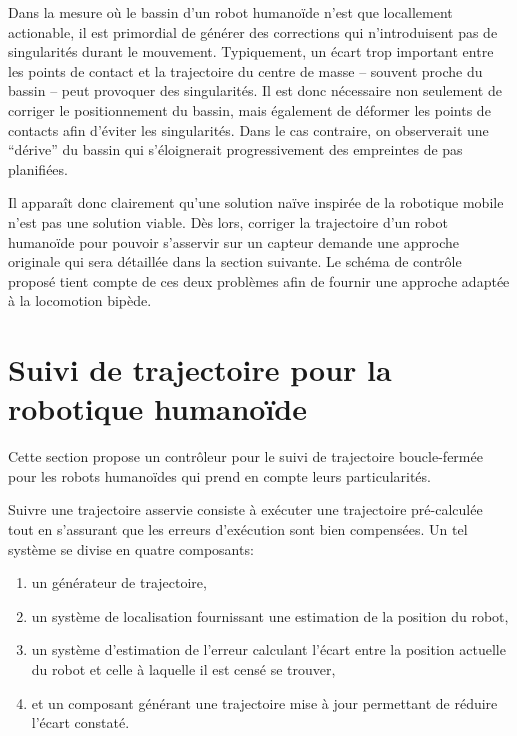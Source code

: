 Dans la mesure où le bassin d'un robot humanoïde n'est que locallement
actionable, il est primordial de générer des corrections qui
n'introduisent pas de singularités durant le mouvement. Typiquement,
un écart trop important entre les points de contact et la trajectoire
du centre de masse -- souvent proche du bassin -- peut provoquer des
singularités. Il est donc nécessaire non seulement de corriger le
positionnement du bassin, mais également de déformer les points de
contacts afin d'éviter les singularités. Dans le cas contraire, on
observerait une ``dérive'' du bassin qui s'éloignerait progressivement
des empreintes de pas planifiées.

Il apparaît donc clairement qu'une solution naïve inspirée de la
robotique mobile n'est pas une solution viable. Dès lors, corriger la
trajectoire d'un robot humanoïde pour pouvoir s'asservir sur un
capteur demande une approche originale qui sera détaillée dans la
section suivante. Le schéma de contrôle proposé tient compte de ces
deux problèmes afin de fournir une approche adaptée à la locomotion
bipède.

\section{Suivi de trajectoire pour la robotique humanoïde}\label{closedloop}


Cette section propose un contrôleur pour le suivi de trajectoire
boucle-fermée pour les robots humanoïdes qui prend en compte leurs
particularités.

Suivre une trajectoire asservie consiste à exécuter une trajectoire
pré-calculée tout en s'assurant que les erreurs d'exécution sont bien
compensées. Un tel système se divise en quatre composants:

\begin{enumerate}
\item un générateur de trajectoire,
\item un système de localisation fournissant une estimation de la position du robot,
\item un système d'estimation de l'erreur calculant l'écart entre la
  position actuelle du robot et celle à laquelle il est censé se
  trouver,
\item et un composant générant une trajectoire mise à jour permettant
  de réduire l'écart constaté.
\end{enumerate}


